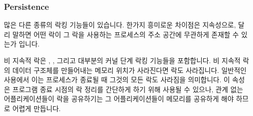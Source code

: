 \subsubsection{Persistence}
\label{sec:future:Persistence}

많은 다른 종류의 락킹 기능들이 있습니다.
한가지 흥미로운 차이점은 지속성으로, 달리 말하면 어떤 락이 그 락을 사용하는
프로세스의 주소 공간에 무관하게 존재할 수 있는가 입니다.

비 지속적 락은 , , 그리고
대부분의 커널 단계 락킹 기능들을 포함합니다.
비 지속적 락의 데이터 구조체를 만들어내는 메모리 위치가 사라진다면 락도
사라집니다.
일반적인  사용에서 이는 프로세스가 종료될 때 그것의
모든 락도 사라짐을 의미합니다.
이 속성은 프로그램 종료 시점의 락 정리를 간단하게 하기 위해 사용될 수 있으나,
관계 없는 어플리케이션들이 락을 공유하기는 그 어플리케이션들이 메모리를
공유하게 해야 하므로 어렵게 만듭니다.

